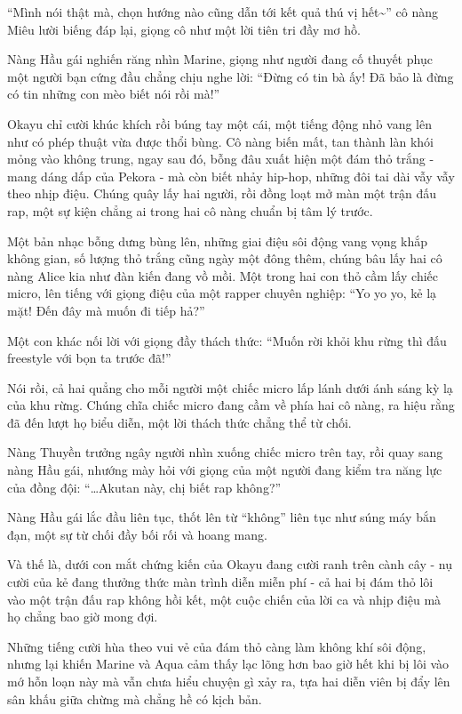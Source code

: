 \documentclass[../main.tex]{subfiles}
\begin{document}
``Mình nói thật mà, chọn hướng nào cũng dẫn tới kết quả thú vị hết\~{}'' cô nàng Miêu lười biếng đáp lại, giọng cô như một lời tiên tri đầy mơ hồ.

Nàng Hầu gái nghiến răng nhìn Marine, giọng như người đang cố thuyết phục một người bạn cứng đầu chẳng chịu nghe lời: ``Đừng có tin bà ấy! Đã bảo là đừng có tin những con mèo biết nói rồi mà!''

Okayu chỉ cười khúc khích rồi búng tay một cái, một tiếng động nhỏ vang lên như có phép thuật vừa được thổi bùng. Cô nàng biến mất, tan thành làn khói mỏng vào không trung, ngay sau đó, bỗng đâu xuất hiện một đám thỏ trắng - mang dáng dấp của Pekora - mà còn biết nhảy hip-hop, những đôi tai dài vẫy vẫy theo nhịp điệu. Chúng quây lấy hai người, rồi đồng loạt mở màn một trận đấu rap, một sự kiện chẳng ai trong hai cô nàng chuẩn bị tâm lý trước.

Một bản nhạc bỗng dưng bùng lên, những giai điệu sôi động vang vọng khắp không gian, số lượng thỏ trắng cũng ngày một đông thêm, chúng bâu lấy hai cô nàng Alice kia như đàn kiến đang vồ mồi. Một trong hai con thỏ cầm lấy chiếc micro, lên tiếng với giọng điệu của một rapper chuyên nghiệp: ``Yo yo yo, kẻ lạ mặt! Đến đây mà muốn đi tiếp hả?''

Một con khác nối lời với giọng đầy thách thức: ``Muốn rời khỏi khu rừng thì đấu freestyle với bọn ta trước đã!''

Nói rồi, cả hai quẳng cho mỗi người một chiếc micro lấp lánh dưới ánh sáng kỳ lạ của khu rừng. Chúng chĩa chiếc micro đang cầm về phía hai cô nàng, ra hiệu rằng đã đến lượt họ biểu diễn, một lời thách thức chẳng thể từ chối.

Nàng Thuyền trưởng ngây người nhìn xuống chiếc micro trên tay, rồi quay sang nàng Hầu gái, nhướng mày hỏi với giọng của một người đang kiểm tra năng lực của đồng đội: ``\dots Akutan này, chị biết rap không?''

Nàng Hầu gái lắc đầu liên tục, thốt lên từ ``không'' liên tục như súng máy bắn đạn, một sự từ chối đầy bối rối và hoang mang.

Và thế là, dưới con mắt chứng kiến của Okayu đang cười ranh trên cành cây - nụ cười của kẻ đang thưởng thức màn trình diễn miễn phí - cả hai bị đám thỏ lôi vào một trận đấu rap không hồi kết, một cuộc chiến của lời ca và nhịp điệu mà họ chẳng bao giờ mong đợi.

Những tiếng cười hùa theo vui vẻ của đám thỏ càng làm không khí sôi động, nhưng lại khiến Marine và Aqua cảm thấy lạc lõng hơn bao giờ hết khi bị lôi vào mớ hỗn loạn này mà vẫn chưa hiểu chuyện gì xảy ra, tựa hai diễn viên bị đẩy lên sân khấu giữa chừng mà chẳng hề có kịch bản.
\end{document}

